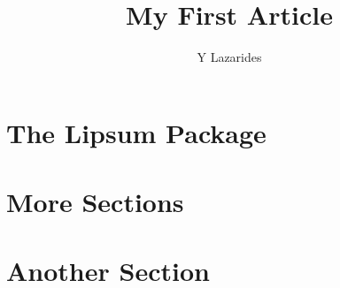 \documentclass{article}
\begin{document}
\title{My First Article}
\author{Y Lazarides}
\maketitle
\section{The Lipsum Package}
\lipsum[1-30]
\section{More Sections}
\lipsum
\section{Another Section}
\lipsum
\end{document}
